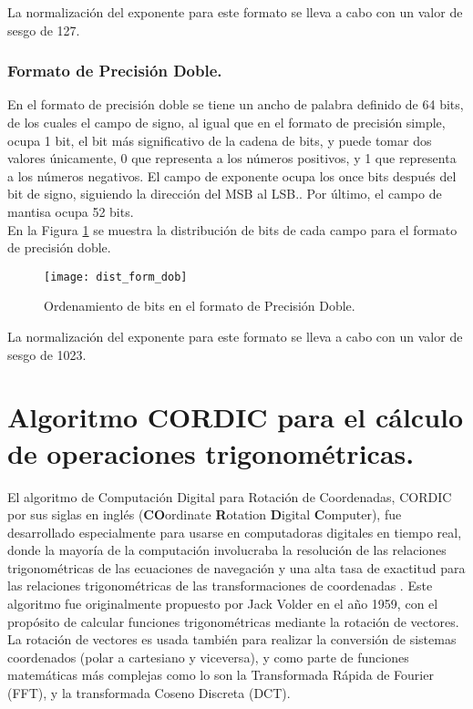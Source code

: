 La normalización del exponente para este formato se lleva a cabo con un valor de sesgo de 127.\\

\subsubsection*{Formato de Precisión Doble.}

En el formato de precisión doble se tiene un ancho de palabra definido de 64 bits, de los cuales el campo de signo, al igual que en el formato de precisión simple, ocupa 1 bit, el bit más significativo de la cadena de bits, y puede tomar dos valores únicamente, 0 que representa a los números positivos, y 1 que representa a los números negativos. El campo de exponente ocupa los once bits después del bit de signo, siguiendo la dirección del MSB al LSB.. Por último, el campo de mantisa ocupa 52 bits.\\

En la Figura \ref{fig:dist_form_dob} se muestra la distribución de bits de cada campo para el formato de precisión doble.\\

\begin{figure}[htb]
  \centering
  \texttt{[image: dist\_form\_dob]}
  \caption{Ordenamiento de bits en el formato de Precisión Doble.}
  \label{fig:dist_form_dob}
\end{figure}

La normalización del exponente para este formato se lleva a cabo con un valor de sesgo de 1023.

\section{Algoritmo CORDIC para el cálculo de operaciones trigonométricas.}

El algoritmo de Computación Digital para Rotación de Coordenadas, CORDIC por sus siglas en inglés (\textbf{CO}ordinate \textbf{R}otation \textbf{D}igital \textbf{C}omputer), fue desarrollado especialmente para usarse en computadoras digitales en tiempo real, donde la mayoría de la computación involucraba la resolución de las relaciones trigonométricas de las ecuaciones de navegación y una alta tasa de exactitud para las relaciones trigonométricas de las transformaciones de coordenadas \cite{CORDIC}.
Este algoritmo fue  originalmente propuesto por Jack Volder en el año 1959, con el propósito de calcular funciones trigonométricas mediante la rotación de vectores. La rotación de vectores es usada también para realizar la conversión de sistemas coordenados (polar a cartesiano y viceversa), y como parte de funciones matemáticas más complejas como lo son la Transformada Rápida de Fourier (FFT), y la transformada Coseno Discreta (DCT).



